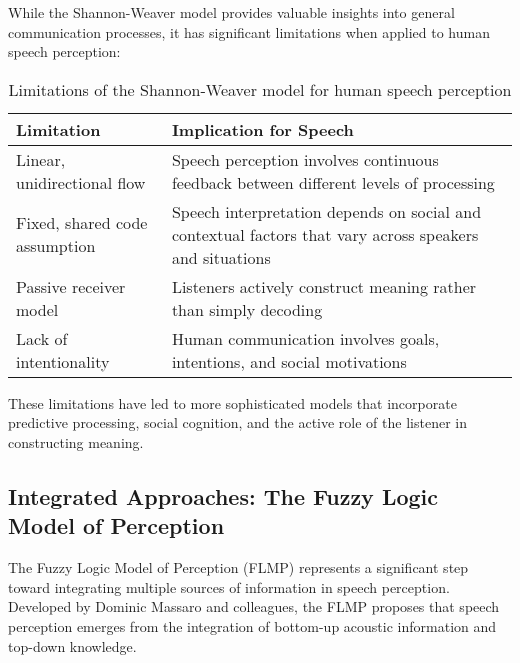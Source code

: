\documentclass[12pt,a4paper]{article}
\begin{document}
While the Shannon-Weaver model provides valuable insights into general communication processes, it has significant limitations when applied to human speech perception:

\begin{table}[h]
\centering
\begin{tabular}{|p{5cm}|p{7cm}|}
\hline
\textbf{Limitation} & \textbf{Implication for Speech} \\
\hline
Linear, unidirectional flow & Speech perception involves continuous feedback between different levels of processing \\
\hline
Fixed, shared code assumption & Speech interpretation depends on social and contextual factors that vary across speakers and situations \\
\hline
Passive receiver model & Listeners actively construct meaning rather than simply decoding \\
\hline
Lack of intentionality & Human communication involves goals, intentions, and social motivations \\
\hline
\end{tabular}
\caption{Limitations of the Shannon-Weaver model for human speech perception}
\label{tbl:shannon_limitations}
\end{table}

These limitations have led to more sophisticated models that incorporate predictive processing, social cognition, and the active role of the listener in constructing meaning.

\subsection{Integrated Approaches: The Fuzzy Logic Model of Perception}

The Fuzzy Logic Model of Perception (FLMP) represents a significant step toward integrating multiple sources of information in speech perception. Developed by Dominic Massaro and colleagues, the FLMP proposes that speech perception emerges from the integration of bottom-up acoustic information and top-down knowledge.
\end{document}

